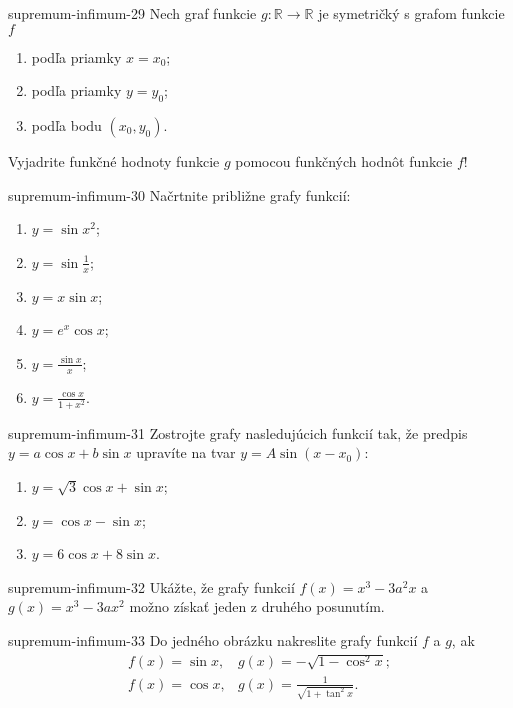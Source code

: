 \begin{defproblem}{supremum-infimum-29}
Nech graf funkcie $g:\mathbb{R}\rightarrow\mathbb{R}$ je symetričký s grafom funkcie $f$
\begin{enumerate}
\item podľa priamky $x=x_0$;
\item podľa priamky $y=y_0$;
\item podľa bodu $(x_0,y_0)$.
\end{enumerate}
Vyjadrite funkčné hodnoty funkcie $g$ pomocou funkčných hodnôt funkcie $f$!
\end{defproblem}

\begin{defproblem}{supremum-infimum-30}
Načrtnite približne grafy funkcií:
\begin{multicols}{2}
\begin{enumerate}
    \item $y=\sin x^2$;
    \item $y=\sin \frac{1}{x}$;
    \item $y=x\sin x$;
    \item $y=e^x\cos x$;
    \item $y=\frac{\sin x}{x}$;
    \item $y=\frac{\cos x}{1+x^2}$.
\end{enumerate}
\end{multicols}
\end{defproblem}

\begin{defproblem}{supremum-infimum-31}
Zostrojte grafy nasledujúcich funkcií tak, že predpis $y=a\cos x +b\sin x$ upravíte na tvar $y=A\sin (x-x_0)$:
\begin{enumerate}
\item $y=\sqrt{3}\cos x +\sin x$;
\item $y=\cos x -\sin x$;
\item $y=6\cos x +8\sin x$.
\end{enumerate}
\end{defproblem}

\begin{defproblem}{supremum-infimum-32}
Ukážte, že grafy funkcií $f(x)=x^3-3a^2x$ a $g(x)=x^3-3ax^2$ možno získať jeden z druhého posunutím.
\end{defproblem}

\begin{defproblem}{supremum-infimum-33}
Do jedného obrázku nakreslite grafy funkcií $f$ a $g$, ak
\begin{align*}
f(x)=\sin x,& g(x)=-\sqrt{1-\cos^2 x};\\
f(x)=\cos x,& g(x)=\frac{1}{\sqrt{1+\tan^2 x}}.
\end{align*}
\end{defproblem}

